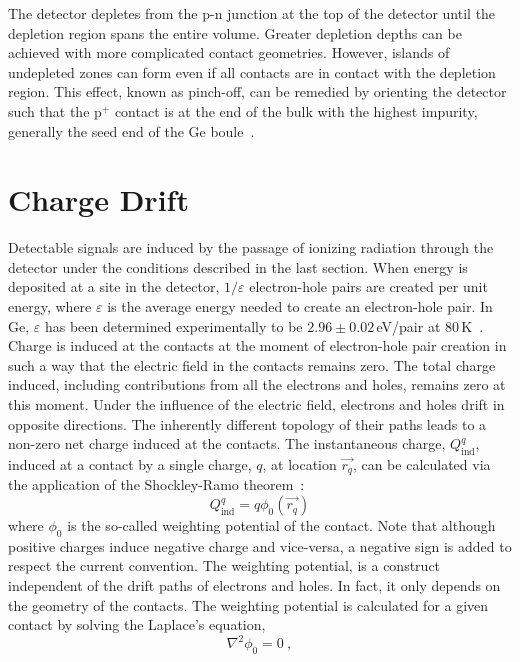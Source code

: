 The detector depletes from the p-n junction at the top of the detector until the depletion region spans the entire volume. Greater depletion depths can be achieved with more complicated contact geometries. However, islands of undepleted zones can form even if all contacts are in contact with the depletion region. This effect, known as pinch-off, can be remedied by orienting the detector such that the p$^+$ contact is at the end of the bulk with the highest impurity, generally the seed end of the Ge boule~\cite{mjd_og}.

\section{Charge Drift}\label{sec:charge_drift}

Detectable signals are induced by the passage of ionizing radiation through the detector under the conditions described in the last section. When energy is deposited at a site in the detector, $1/\varepsilon$ electron-hole pairs are created per unit energy, where $\varepsilon$ is the average energy needed to create an electron-hole pair. In Ge, $\varepsilon$ has been determined experimentally to be $2.96\pm0.02$\,eV/pair at 80\,K~\cite{energy_pair}. Charge is induced at the contacts at the moment of electron-hole pair creation in such a way that the electric field in the contacts remains zero. The total charge induced, including contributions from all the electrons and holes, remains zero at this moment. Under the influence of the electric field, electrons and holes drift in opposite directions. The inherently different topology of their paths leads to a non-zero net charge induced at the contacts. The instantaneous charge, $Q^q_\text{ind}$, induced at a contact by a single charge, $q$, at location $\vec{r_q}$, can be calculated via the application of the Shockley-Ramo theorem~\cite{shockley,ramo}: 
\begin{equation}
	Q^q_\text{ind} = q\phi_0(\vec{r_q})
	\label{eq:charge_ind}
\end{equation}
where $\phi_0$ is the so-called weighting potential of the contact. Note that although positive charges induce negative charge and vice-versa, a negative sign is added to respect the current convention. The weighting potential, is a construct independent of the drift paths of electrons and holes. In fact, it only depends on the geometry of the contacts. The weighting potential is calculated for a given contact by solving the Laplace's equation,
 \begin{equation}
	\nabla^2\phi_0=0~,
	\label{eq:laplace}
\end{equation}
